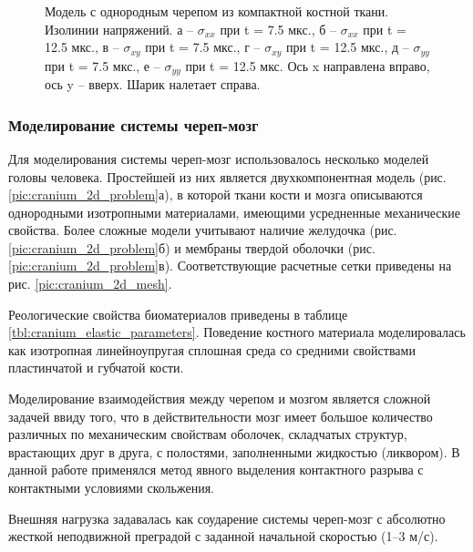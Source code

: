 \begin{figure}[h]
\begin{subfigure}[b]{0.13\textwidth}
\caption{ }
\end{subfigure}
\caption{Модель с однородным черепом из компактной костной ткани.  Изолинии напряжений. а -- $\sigma_{xx}$ при t = 7.5 мкс., б -- $\sigma_{xx}$ при t = 12.5 мкс., в -- $\sigma_{xy}$ при t = 7.5 мкс., г -- $\sigma_{xy}$ при t = 12.5 мкс., д -- $\sigma_{yy}$ при t = 7.5 мкс., е -- $\sigma_{yy}$ при t = 12.5 мкс. Ось x направлена вправо, ось y -- вверх. Шарик налетает справа.}
\label{pic:cranium_2d_simple_model}
\end{figure}

\clearpage
\newpage

\subsubsection*{Моделирование системы череп-мозг}

Для моделирования системы череп-мозг использовалось несколько моделей головы человека. Простейшей из них является двухкомпонентная модель (рис. \ref{pic:cranium_2d_problem}а), в которой ткани кости и мозга описываются однородными изотропными материалами, имеющими усредненные механические свойства. Более сложные модели учитывают наличие желудочка (рис. \ref{pic:cranium_2d_problem}б) и мембраны твердой оболочки (рис. \ref{pic:cranium_2d_problem}в). Соответствующие расчетные сетки приведены на рис. \ref{pic:cranium_2d_mesh}.

Реологические свойства биоматериалов приведены в таблице \ref{tbl:cranium_elastic_parameters}. Поведение костного материала моделировалась как изотропная линейноупругая сплошная среда со средними свойствами пластинчатой и губчатой кости.

Моделирование взаимодействия между черепом и мозгом является сложной задачей ввиду того, что в действительности мозг имеет большое количество различных по механическим свойствам оболочек, складчатых структур, врастающих друг в друга, с полостями, заполненными жидкостью (ликвором). В данной работе применялся метод явного выделения контактного разрыва с контактными условиями скольжения.

Внешняя нагрузка задавалась как соударение системы череп-мозг с абсолютно жесткой неподвижной преградой с заданной начальной скоростью (1--3 м/с).

